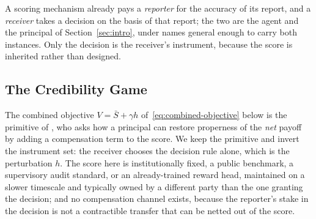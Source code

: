 \documentclass[acmsmall,nonacm,screen]{acmart}
\theoremstyle{acmplain}%
\theoremstyle{acmdefinition}%
\newcommand{\Sbar}{\bar{S}}
\numberwithin{equation}{section}
\begin{document}
A scoring mechanism already pays a \emph{reporter} for the accuracy of its report, and a \emph{receiver} takes a decision on the basis of that report; the two are the agent and the principal of Section~\ref{sec:intro}, under names general enough to carry both instances. Only the decision is the receiver's instrument, because the score is inherited rather than designed.

\subsection{The Credibility Game}

The combined objective $V = \Sbar + \gamma h$ of~\eqref{eq:combined-objective} below is the primitive of \citet{boutilier2012eliciting}, who asks how a principal can restore properness of the \emph{net} payoff by adding a compensation term to the score. We keep the primitive and invert the instrument set: the receiver chooses the decision rule alone, which is the perturbation $h$. The score here is institutionally fixed, a public benchmark, a supervisory audit standard, or an already-trained reward head, maintained on a slower timescale and typically owned by a different party than the one granting the decision; and no compensation channel exists, because the reporter's stake in the decision is not a contractible transfer that can be netted out of the score.
\end{document}
